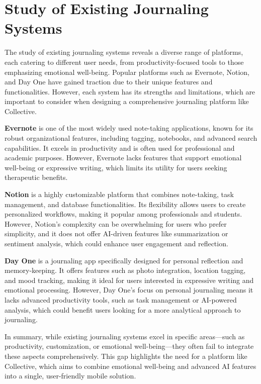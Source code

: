 \section{Study of Existing Journaling Systems}\label{sec:existing-systems}

The study of existing journaling systems reveals a diverse range of platforms, each catering to different user needs, from productivity-focused tools to those emphasizing emotional well-being. Popular platforms such as Evernote, Notion, and Day One have gained traction due to their unique features and functionalities. However, each system has its strengths and limitations, which are important to consider when designing a comprehensive journaling platform like Collective.

\textbf{Evernote} is one of the most widely used note-taking applications, known for its robust organizational features, including tagging, notebooks, and advanced search capabilities. It excels in productivity and is often used for professional and academic purposes. However, Evernote lacks features that support emotional well-being or expressive writing, which limits its utility for users seeking therapeutic benefits.

\textbf{Notion} is a highly customizable platform that combines note-taking, task management, and database functionalities. Its flexibility allows users to create personalized workflows, making it popular among professionals and students. However, Notion's complexity can be overwhelming for users who prefer simplicity, and it does not offer AI-driven features like summarization or sentiment analysis, which could enhance user engagement and reflection.

\textbf{Day One} is a journaling app specifically designed for personal reflection and memory-keeping. It offers features such as photo integration, location tagging, and mood tracking, making it ideal for users interested in expressive writing and emotional processing. However, Day One's focus on personal journaling means it lacks advanced productivity tools, such as task management or AI-powered analysis, which could benefit users looking for a more analytical approach to journaling.

In summary, while existing journaling systems excel in specific areas—such as productivity, customization, or emotional well-being—they often fail to integrate these aspects comprehensively. This gap highlights the need for a platform like Collective, which aims to combine emotional well-being and advanced AI features into a single, user-friendly mobile solution.

